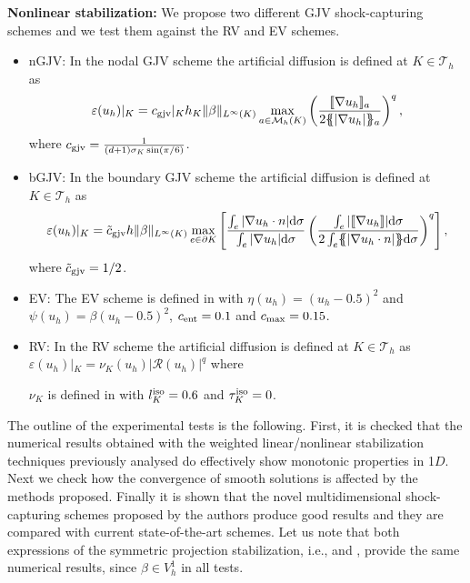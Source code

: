 \begin{algorithm}[Hhtbp]
{\bf Nonlinear stabilization:} We propose two different GJV shock-capturing schemes and we test them against the RV and EV schemes.
\setlength{\leftmargini}{0pt}
\begin{itemize}
\item nGJV: In the nodal GJV scheme the artificial diffusion is defined at $K \in \mathcal{T}_h$ as
\begin{align*}%
\varepsilon(u_h)|_K = c_{\rm gjv}|_K h_K \|\beta\|_{L^\infty(K)} \max_{a \in \setnodes(K)}\left(\frac{ \jump{\nabla u_h}_a }{2\mean{|\nabla u_h|}_a}\right)^q,
\end{align*}
where $c_{\rm gjv} = \frac{1}{(d+1) \sigma_K \sin (\pi/6)}$. %
\item bGJV: In the boundary GJV scheme the artificial diffusion is defined at $K \in \mathcal{T}_h$ as
\begin{align*}%
\varepsilon(u_h)|_K = \tilde c_{\rm gjv} h \|\beta\|_{L^\infty(K)} \max_{e \in \partial K}\left[\frac{\int_e |\nabla u_h \cdot n|{\rm d} \sigma}{\int_e |\nabla u_h| {\rm d} \sigma}\left(\frac{\int_e  | \jump{\nabla u_h}|{\rm d} \sigma }{ 2 \int_e \mean{|\nabla u_h \cdot n|} {\rm d} \sigma}\right)^q\right],
\end{align*}
where $\tilde c_{\rm gjv} = 1/2$.
\item EV: The EV scheme is defined in  with $\eta(u_h) = (u_h-0.5)^2$ and $\psi(u_h) = \beta(u_h-0.5)^2$, $c_{\rm ent} = 0.1$ and $c_{\rm max}=0.15$. 
\item RV: In the RV  scheme the artificial diffusion is defined at $K \in \mathcal{T}_h$ as $\varepsilon(u_h)|_K = \nu_K(u_h) |\mathcal{R}(u_h)|^q$ where

 $\nu_K$ is defined in  with $l_K^{\rm iso}=0.6$ and $\tau_K^{\rm iso}=0$.
\end{itemize}
\caption{Combination of linear stabilization and shock-capturing techniques\label{alg-wNPS-GJV}}
\end{algorithm}

The outline of the experimental tests is the following. First, it is checked that the numerical results obtained with the weighted linear/nonlinear stabilization techniques previously analysed do effectively show monotonic properties in 1$D$. Next we check how the convergence of smooth solutions is affected by the methods proposed.  Finally it is shown that the novel multidimensional shock-capturing schemes proposed by the authors produce good results and they are compared with current state-of-the-art schemes. Let us note that both expressions of the symmetric projection stabilization, i.e.,  and , provide the same numerical results, since $\beta  \in V_h^1$ in all tests.

